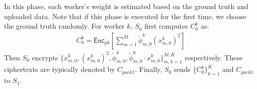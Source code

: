 \documentclass[conference]{IEEEtran}
\begin{document}
In this phase, each worker's weight is estimated based on the ground truth and uploaded data.
Note that if this phase is executed for the first time, we choose the ground truth randomly.
For worker $k$, $S_0$ first computes $C_0^k$ as: 
\begin{equation}
  \begin{split}
  C_0^k = \mathsf{Enc}_{pk}\left[\sum_{m=1}^M \tilde{\phi}_{m,0}^k \left(x_{m,0}^k\right)^2\right]
  \end{split}
\end{equation}
Then $S_0$ encrypts $\{x_{m,0}^k, (x_{m,0}^k)^2, \tilde{\phi}_{m,0}^k,\tilde{\phi}_{m,0}^k\cdot x_{m,0}^k\}_{m,k=1}^{M,K}$ respectively.
These ciphertexts are typically denoted by $C_{pack1}$.
Finally, $S_0$ sends $\{C_0^k\}_{k=1}^K$ and $C_{pack1}$ to $S_1$.
\end{document}
